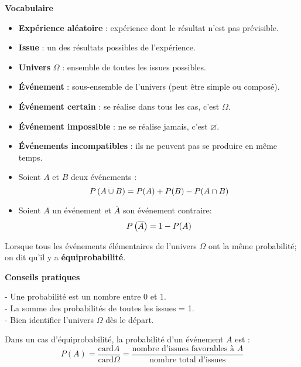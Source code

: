 


 \textbf{Vocabulaire}
\begin{itemize}
    \item \textbf{Expérience aléatoire} : expérience dont le résultat n’est pas prévisible.
    \item \textbf{Issue} : un des résultats possibles de l'expérience.
    \item \textbf{Univers} $\Omega$ : ensemble de toutes les issues possibles.
    \item \textbf{Événement} : sous-ensemble de l’univers (peut être simple ou composé).
    \item \textbf{Événement certain} : se réalise dans tous les cas, c’est $\Omega$.
    \item \textbf{Événement impossible} : ne se réalise jamais, c’est $\varnothing$.
    \item \textbf{Événements incompatibles} : ils ne peuvent pas se produire en même temps.
\end{itemize}
 \begin{property}
 \begin{itemize}
 \item Soient $A $ et $ B$ deux événements : \[P\left(A\cup B\right)=P(A)+P(B)-P(A\cap B)\]
 \item Soient $A $ un  événement et $ \overline{A}$  son événement contraire: \[P\left(\overline{A}\right)=1-P(A)\]
 \end{itemize}
 \end{property}
   \begin{definition}
   Lorsque tous les événements élémentaires de l'univers $ \Omega $ ont la même probabilité; on dit qu'il y a \textbf{équiprobabilité}.
  \end{definition}

  
\textbf{Conseils pratiques}

- Une probabilité est un nombre entre $ 0 $ et $ 1 $.\\
- La somme des probabilités de toutes les issues = 1.\\
- Bien identifier l’univers \( \Omega \) dès le départ.


  \begin{property}
  Dans un cas d'équiprobabilité, la probabilité d'un événement $A$ est : $$ P(A)=\dfrac{\text{card}A }{\text{card}\Omega}=\dfrac{\text{nombre d’issues favorables à } A}{\text{nombre total d’issues}}$$
  \end{property}

